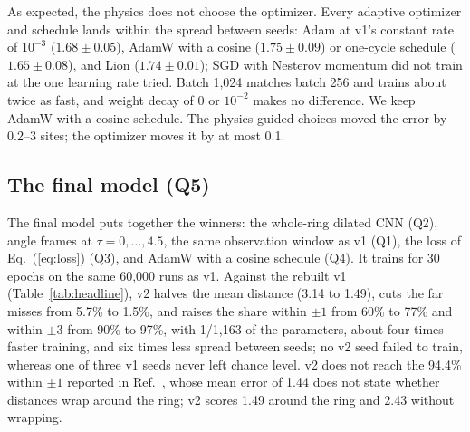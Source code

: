 \documentclass[11pt]{article}
\begin{document}
As expected, the physics does not choose the optimizer. Every adaptive optimizer and schedule lands within the spread between seeds: Adam at v1's constant rate of $10^{-3}$ ($1.68\pm0.05$), AdamW with a cosine ($1.75\pm0.09$) or one-cycle schedule \cite{smith2019super} ($1.65\pm0.08$), and Lion \cite{chen2023symbolic} ($1.74\pm0.01$); SGD with Nesterov momentum did not train at the one learning rate tried. Batch 1,024 matches batch 256 and trains about twice as fast, and weight decay of 0 or $10^{-2}$ makes no difference. We keep AdamW with a cosine schedule. The physics-guided choices moved the error by 0.2--3 sites; the optimizer moves it by at most 0.1.

\subsection{The final model (Q5)}
\label{sec:final}

The final model puts together the winners: the whole-ring dilated CNN (Q2), angle frames at $\tau=0,\dots,4.5$, the same observation window as v1 (Q1), the loss of Eq.~(\ref{eq:loss}) (Q3), and AdamW with a cosine schedule (Q4). It trains for 30 epochs on the same 60,000 runs as v1. Against the rebuilt v1 (Table~\ref{tab:headline}), v2 halves the mean distance (3.14 to 1.49), cuts the far misses from 5.7\% to 1.5\%, and raises the share within $\pm1$ from 60\% to 77\% and within $\pm3$ from 90\% to 97\%, with 1/1,163 of the parameters, about four times faster training, and six times less spread between seeds; no v2 seed failed to train, whereas one of three v1 seeds never left chance level. v2 does not reach the 94.4\% within $\pm1$ reported in Ref.~\cite{mittal2026jand}, whose mean error of 1.44 does not state whether distances wrap around the ring; v2 scores 1.49 around the ring and 2.43 without wrapping.
\end{document}
